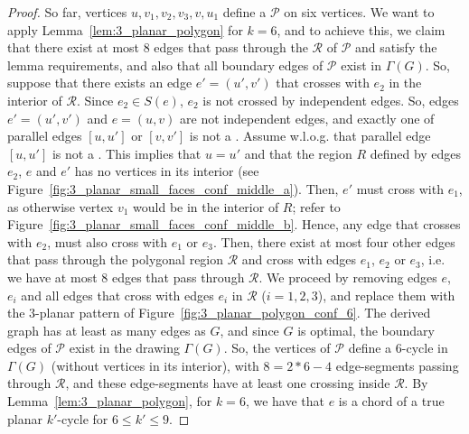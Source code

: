 \begin{proof}

So far, vertices $u,v_1,v_2,v_3,v,u_1$ define a \pp $\mathcal{P}$ on six vertices. We want to apply Lemma~\ref{lem:3_planar_polygon} for $k=6$, and to achieve this, we claim that there exist at most $8$ edges that pass through the \pr $\mathcal{R}$ of $\mathcal{P}$ and satisfy the lemma requirements, and also that all boundary edges of $\mathcal{P}$ exist in $\Gamma(G)$. So, suppose that there exists an edge $e'=(u',v')$ that crosses with $e_2$ in the interior of $\mathcal{R}$. Since $e_2\in S(e)$, $e_2$ is not crossed by independent edges. So, edges $e'=(u',v')$ and $e=(u,v)$ are not independent edges, and exactly one of parallel edges $[u,u']$ or $[v,v']$ is not a \pe. Assume w.l.o.g. that parallel edge $[u,u']$ is not a \pe. This implies that $u=u'$ and that the region $R$ defined by edges $e_2$, $e$ and $e'$ has no vertices in its interior (see Figure~\ref{fig:3_planar_small_faces_conf_middle_a}). Then, $e'$ must cross with $e_1$, as otherwise vertex $v_1$ would be in the interior of $R$; refer to Figure~\ref{fig:3_planar_small_faces_conf_middle_b}. Hence, any edge that crosses with $e_2$, must also cross with $e_1$ or $e_3$. Then, there exist at most four other edges that pass through the polygonal region $\mathcal{R}$ and cross with edges $e_1$, $e_2$ or $e_3$, i.e. we have at most $8$ edges that pass through $\mathcal{R}$. We proceed by removing edges $e$, $e_i$ and all edges that cross with edges $e_i$ in  $\mathcal{R}$ ($i=1,2,3$), and replace them with the $3$-planar pattern of Figure~\ref{fig:3_planar_polygon_conf_6}. The derived graph has at least as many edges as $G$, and since $G$ is optimal, the boundary edges of $\mathcal{P}$ exist in the drawing $\Gamma(G)$. So, the vertices of $\mathcal{P}$ define a $6$-cycle in $\Gamma(G)$ (without vertices in its interior), with $8=2*6-4$ edge-segments passing through $\mathcal{R}$, and these edge-segments have at least one crossing inside $\mathcal{R}$. By Lemma~\ref{lem:3_planar_polygon}, for $k=6$, we have that $e$ is a chord of a true planar $k'$-cycle for $6\leq k'\leq 9$.
\end{proof}

